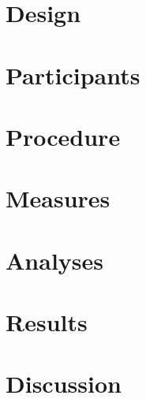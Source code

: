 

\section{Design}%
\section{Participants}
\section{Procedure}
\section{Measures}
\section{Analyses}
\section{Results}
\section{Discussion}
